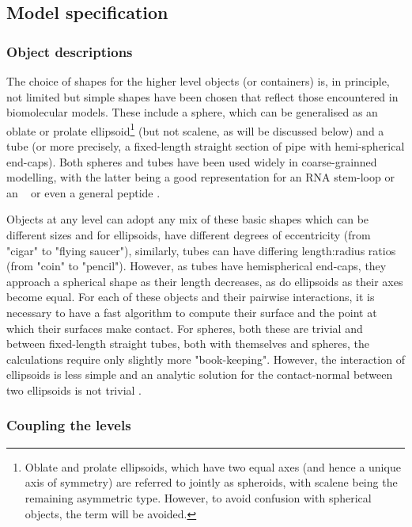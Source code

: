 \documentclass[review]{elsarticle}
\begin{document}
\subsection{Model specification}

\subsubsection{Object descriptions}
 
The choice of shapes for the higher level objects (or containers) is, in principle, not
limited but simple shapes have been chosen that reflect those encountered in biomolecular
models.   These include a sphere, which can be generalised as an oblate or prolate
ellipsoid\footnote{
Oblate and prolate ellipsoids, which have two equal axes (and hence a unique axis of symmetry)
are referred to jointly as spheroids, with scalene being the remaining asymmetric type.  
However, to avoid confusion with spherical objects, the term will be avoided.}
(but not scalene, as will be discussed below) and a tube (or more precisely, a fixed-length
straight section of pipe with hemi-spherical end-caps).  Both spheres and tubes have been
used widely in coarse-grainned modelling, with the latter being a good representation
for an RNA stem-loop \cite{DingFet08} or an \AH\ \cite{MinaryPet10} or even a general peptide \cite{VachaRet14}.

Objects at any level can adopt any mix of these basic shapes which can be different 
sizes and for ellipsoids, have different degrees of eccentricity (from "cigar" to "flying 
saucer"), similarly, tubes can have differing length:radius ratios (from "coin" to "pencil").
However, as tubes have hemispherical end-caps, they approach a spherical shape as their
length decreases, as do ellipsoids as their axes become equal.
For each of these objects and their pairwise interactions, it is necessary to have 
a fast algorithm to compute their surface and the point at which their surfaces
make contact.   For spheres, both these are trivial and between fixed-length straight
tubes, both with themselves and spheres, the calculations require only slightly more
"book-keeping".    However, the interaction of ellipsoids is less simple and an analytic
solution for the contact-normal between two ellipsoids is not trivial \cite{DonevAet04b,KallrathJ15}.

\subsubsection{Coupling the levels}
\end{document}
